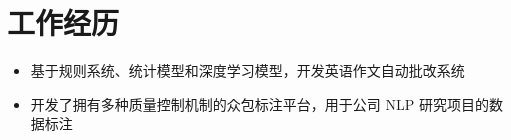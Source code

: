 \section{工作经历}
\begin{itemize}
  \item 基于规则系统、统计模型和深度学习模型，开发英语作文自动批改系统
  \item 开发了拥有多种质量控制机制的众包标注平台，用于公司 NLP 研究项目的数据标注
\end{itemize}


